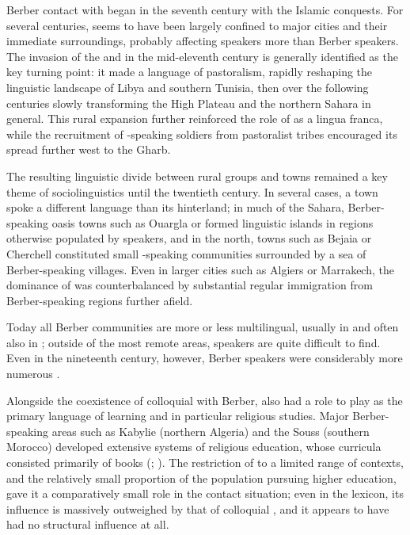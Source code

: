 \documentclass[output=paper]{langsci/langscibook}
\begin{document}
Berber contact with  began in the seventh century with the Islamic conquests. For several centuries,  seems to have been largely confined to major cities and their immediate surroundings, probably affecting  speakers more than Berber speakers. The invasion of the  and  in the mid-eleventh century is generally identified as the key turning point: it made  a language of pastoralism, rapidly reshaping the linguistic landscape of Libya and southern Tunisia, then over the following centuries slowly transforming the High Plateau and the northern Sahara in general.  This rural expansion further reinforced the role of  as a lingua franca, while the recruitment of -speaking soldiers from pastoralist tribes encouraged its spread further west to the  Gharb.

The resulting linguistic divide between rural groups and towns remained a key theme of  sociolinguistics until the twentieth century. In several cases, a town spoke a different language than its hinterland; in much of the Sahara, Berber-speaking oasis towns such as Ouargla or  formed linguistic islands in regions otherwise populated by  speakers, and in the north, towns such as Bejaia or Cherchell constituted small -speaking communities surrounded by a sea of Berber-speaking villages. Even in larger cities such as Algiers or Marrakech, the dominance of  was counterbalanced by substantial regular immigration from Berber-speaking regions further afield.

Today all Berber communities are more or less multilingual, usually in  and often also in ; outside of the most remote areas,  speakers are quite difficult to find. Even in the nineteenth century, however,  Berber speakers were considerably more numerous \citep[41]{Kossmann2013book}.

Alongside the coexistence of colloquial   with Berber,   also had a role to play as the primary language of learning and in particular religious studies.  Major Berber-speaking areas such as Kabylie (northern Algeria) and the Souss (southern Morocco) developed extensive systems of religious education, whose curricula consisted primarily of  books (\citealt{Boogert1997}; \citealt{Mechehed2007}). The restriction of   to a limited range of contexts, and the relatively small proportion of the population pursuing higher education, gave it a comparatively small role in the contact situation; even in the lexicon, its influence is massively outweighed by that of colloquial , and it appears to have had no structural influence at all.
\end{document}
